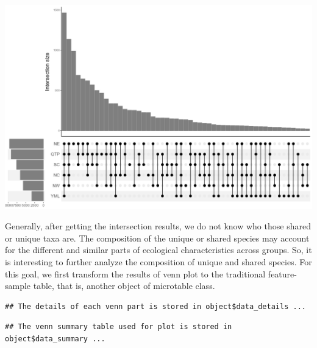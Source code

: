 \documentclass[
]{book}
\newenvironment{Shaded}{\begin{snugshade}}{\end{snugshade}}
\newcommand{\AttributeTok}[1]{\textcolor[rgb]{0.77,0.63,0.00}{#1}}
\newcommand{\FunctionTok}[1]{\textcolor[rgb]{0.00,0.00,0.00}{#1}}
\newcommand{\NormalTok}[1]{#1}
\newcommand{\OtherTok}[1]{\textcolor[rgb]{0.56,0.35,0.01}{#1}}
\newcommand{\SpecialCharTok}[1]{\textcolor[rgb]{0.00,0.00,0.00}{#1}}
\newcommand{\StringTok}[1]{\textcolor[rgb]{0.31,0.60,0.02}{#1}}
\begin{document}
\begin{center}\includegraphics[width=800px]{Images/trans_venn_3} \end{center}

Generally, after getting the intersection results, we do not know who those shared or unique taxa are.
The composition of the unique or shared species may account for the different and similar parts of ecological characteristics across groups\citep{Mendes_Deciphering_2011}.
So, it is interesting to further analyze the composition of unique and shared species.
For this goal, we first transform the results of venn plot to the traditional feature-sample table, that is, another object of microtable class.

\begin{Shaded}
\end{Shaded}

\begin{verbatim}
## The details of each venn part is stored in object$data_details ...
\end{verbatim}

\begin{verbatim}
## The venn summary table used for plot is stored in object$data_summary ...
\end{verbatim}
\end{document}

